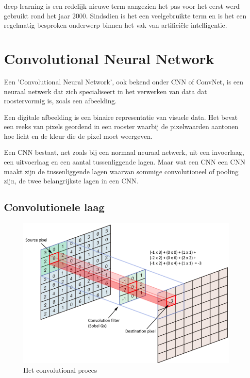 deep learning is een redelijk nieuwe term aangezien het pas voor het eerst werd gebruikt rond het jaar 2000. Sindsdien is het een veelgebruikte term en is het een regelmatig besproken onderwerp binnen het vak van artificiële intelligentie. \autocite{Goff2018}


\section{Convolutional Neural Network}

Een 'Convolutional Neural Network', ook bekend onder CNN of ConvNet, is een neuraal netwerk dat zich specialiseert in het verwerken van data dat roostervormig is, zoals een afbeelding. 


Een digitale afbeelding is een binaire representatie van visuele data. Het bevat een reeks van pixels geordend in een rooster waarbij de pixelwaarden aantonen hoe licht en de kleur die de pixel moet weergeven.

Een CNN bestaat, net zoals bij een normaal neuraal netwerk, uit een invoerlaag, een uitvoerlaag en een aantal tussenliggende lagen.
Maar wat een CNN een CNN maakt zijn de tussenliggende lagen waarvan sommige convolutioneel of pooling zijn, de twee belangrijkste lagen in een CNN.

\subsection{Convolutionele laag}




\begin{figure}
	
	
	\includegraphics[width=\linewidth]{img/convolution.png}
	\caption{Het convolutional proces}
	\label{tab:convolutional}
\end{figure}

